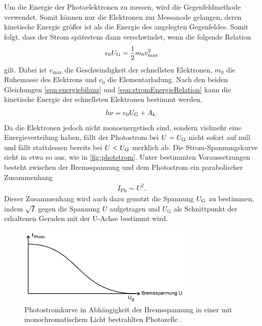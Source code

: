 \noindent
Um die Energie der Photoelektronen zu messen, wird die Gegenfeldmethode verwendet. Somit können nur die Elektronen zur Messanode gelangen, deren kinetische Energie
größer ist als die Energie des angelegten Gegenfeldes. Somit folgt, dass der Strom spätestens dann verschwindet, wenn die folgende Relation 
\begin{align}
    e_0 U_{\text G}=\frac 12 m_0v_{\text{max}}^2
    \label{eqn:stromEnergieRelation}
\end{align}
gilt. Dabei ist $v_{\text{max}}$ die Geschwindigkeit der schnellsten Elektronen, $m_0$ die Ruhemasse des Elektrons und $e_0$ die Elementarladung. Nach den beiden
Gleichungen \eqref{eqn:energiebilanz} und \eqref{eqn:stromEnergieRelation} kann die kinetische Energie der schnellsten Elektronen bestimmt werden,
\begin{align}
    h\nu = e_0 U_{\text G} + A_{\text k}.
    \label{eqn:energieElektr}
\end{align}
Da die Elektronen jedoch nicht monoenergetisch sind, sondern vielmehr eine Energieverteilung haben, fällt der Photostrom bei $U=U_{\text G}$ nicht sofort auf null und fällt
stattdessen bereits bei $U<U_{\text G}$ merklich ab. Die Strom-Spannungskurve sieht in etwa so aus, wie in \autoref{fig:photstrom}. Unter bestimmten Voraussetzungen besteht zwischen der Bremsspannung
und dem Photostrom ein parabolischer Zusammenhang
\begin{align}
    I_{\text{Ph}} \sim U^2.
    \label{eqn:wurzelIGesetz}
\end{align}
Dieser Zusammenhang wird auch dazu genutzt die Spannung $U_{\text G}$ zu bestimmen, indem $\sqrt I$ gegen die Spannung $U$ aufgetragen und $U_{\text{G}}$ 
als Schnittpunkt der erhaltenen Geraden mit der U-Achse bestimmt wird.
\begin{figure}[H]
    \centering
    \includegraphics[width = 0.75\textwidth]{data/Photostrom.png}
    \caption{Photostromkurve in Abhängigkeit der Bremsspannung in einer mit monochromatischem Licht bestrahlten Photozelle \cite{Anleitung500}.}
    \label{fig:photstrom}
\end{figure}